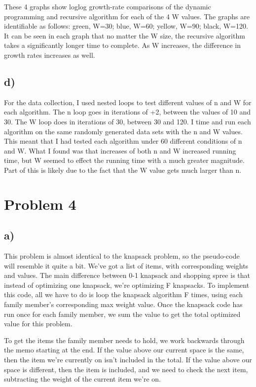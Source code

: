 \documentclass{article}
\begin{document}
These 4 graphs show loglog growth-rate comparisons of the dynamic programming and recursive algorithm for each of the 4 W values. The graphs are identifiable as follows: green, W=30; blue, W=60; yellow, W=90; black, W=120.  It can be seen in each graph that no matter the W size, the recursive algorithm takes a significantly longer time to complete.  As W increases, the difference in growth rates increases as well.

\subsection*{d)}

For the data collection, I used nested loops to test different values of n and W for each algorithm.  The n loop goes in iterations of +2, between the values of 10 and 30.  The W loop does in iterations of 30, between 30 and 120.  I time and run each algorithm on the same randomly generated data sets with the n and W values.  This meant that I had tested each algorithm under 60 different conditions of n and W.  What I found was that increases of both n and W increased running time, but W seemed to effect the running time with a much greater magnitude.  Part of this is likely due to the fact that the W value gets much larger than n.  

\section*{Problem 4}

\subsection*{a)}

This problem is almost identical to the knapsack problem, so the pseudo-code will resemble it quite a bit.  We've got a list of items, with corresponding weights and values.  The main difference between 0-1 knapsack and shopping spree is that instead of optimizing one knapsack, we're optimizing F knapsacks.  To implement this code, all we have to do is loop the knapsack algorithm F times, using each family member's corresponding max weight value.  Once the knapsack code has run once for each family member, we sum the value to get the total optimized value for this problem.

To get the items the family member needs to hold, we work backwards through the memo starting at the end.  If the value above our current space is the same, then the item we're currently on isn't included in the total.  If the value above our space is different, then the item is included, and we need to check the next item, subtracting the weight of the current item we're on.\\
\end{document}
